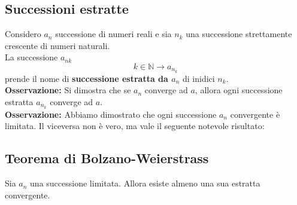 \documentclass{article}
\begin{document}
\subsection{Successioni estratte}
Considero $a_n$ successione di numeri reali e sia $n_k$ una successione
strettamente crescente di numeri naturali.\\ La successione $a_{nk}$
\[
    k\in\mathbb{N} \to a_{n_k}
\]
prende il nome di \textbf{successione estratta da $a_n$} di inidici $n_k$.\\
\textbf{Osservazione:} Si dimostra che se $a_n$ converge ad $a$, allora ogni
successione estratta $a_{n_k}$ converge ad $a$.\\ \textbf{Osservazione:}
Abbiamo dimostrato che ogni successione $a_n$ convergente è limitata. Il
viceversa non è vero, ma vale il seguente notevole risultato:

\subsection{Teorema di Bolzano-Weierstrass}
Sia $a_n$ una successione limitata. Allora esiste almeno una sua estratta
convergente.
\end{document}
